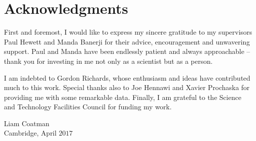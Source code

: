 
\bigskip

\begingroup
\let\clearpage\relax
\let\cleardoublepage\relax
\let\cleardoublepage\relax
\chapter*{Acknowledgments}

First and foremost, I would like to express my sincere gratitude to my supervisors Paul Hewett and Manda Banerji for their advice, encouragement and unwavering support.
Paul and Manda have been endlessly patient and always approachable -- thank you for investing in me not only as a scientist but as a person. 

I am indebted to Gordon Richards, whose enthusiasm and ideas have contributed much to this work. 
Special thanks also to Joe Hennawi and Xavier Prochaska for providing me with some remarkable data. 
Finally, I am grateful to the Science and Technology Facilities Council for funding my work.


\begin{flushright}
Liam Coatman \\
Cambridge, April $2017$
\end{flushright}

\endgroup



